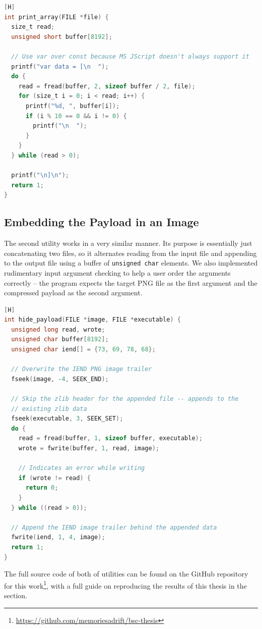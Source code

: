 \begin{lstlisting}[language=C, caption={Payload serialisation function}][H]
int print_array(FILE *file) {
  size_t read;
  unsigned short buffer[8192];

  // Use var over const because MS JScript doesn't always support it
  printf("var data = [\n  ");
  do {
    read = fread(buffer, 2, sizeof buffer / 2, file);
    for (size_t i = 0; i < read; i++) {
      printf("%d, ", buffer[i]);
      if (i % 10 == 0 && i != 0) {
        printf("\n  ");
      }
    }
  } while (read > 0);

  printf("\n]\n");
  return 1;
}
\end{lstlisting}

\subsection{Embedding the Payload in an Image}
The second utility works in a very similar manner. Its purpose is essentially just concatenating two files, so it
alternates reading from the input file and appending to the output file using a buffer of \verb+unsigned char+ elements. 
We also implemented rudimentary input argument checking to help a user order the arguments correctly -- the program 
expects the target \acrshort{PNG} file as the first argument and the compressed payload as the second argument.

\begin{lstlisting}[language=C, caption={Payload concealment function to attach the compressed \acrshort{HTA} to the
\acrshort{PNG}.}][H]
int hide_payload(FILE *image, FILE *executable) {
  unsigned long read, wrote;
  unsigned char buffer[8192];
  unsigned char iend[] = {73, 69, 78, 68};

  // Overwrite the IEND PNG image trailer
  fseek(image, -4, SEEK_END); 

  // Skip the zlib header for the appended file -- appends to the
  // existing zlib data
  fseek(executable, 3, SEEK_SET);
  do {
    read = fread(buffer, 1, sizeof buffer, executable);
    wrote = fwrite(buffer, 1, read, image);

    // Indicates an error while writing
    if (wrote != read) {
      return 0;
    }
  } while ((read > 0));

  // Append the IEND image trailer behind the appended data
  fwrite(iend, 1, 4, image); 
  return 1;
}
\end{lstlisting}

The full source code of both of utilities can be found on the GitHub repository for this 
work\footnote{\url{https://github.com/memoriesadrift/bsc-thesis}}, with a full guide on reproducing the results of this 
thesis in the  section.

